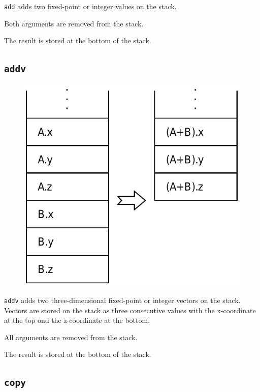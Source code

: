 			\texttt{add} adds two fixed-point or integer values on the stack.
			
			Both arguments are removed from the stack.
			
			The result is stored at the bottom of the stack.
	
	\qquad
	
	\subsection*{\texttt{addv}}
	
		\begin{figure}
			\begin{flushright}
				\includegraphics[width=\linewidth]{figure/pdf/i_addv} 
			\end{flushright}
		\end{figure}
	
			\texttt{addv} adds two three-dimensional fixed-point or integer
			vectors on the stack. Vectors are stored on the stack as three
			consecutive values with the x-coordinate at the top ond the
			z-coordinate at the bottom.
			
			All arguments are removed from the stack.
			
			The result is stored at the bottom of the stack.
	
	\qquad\qquad
	
	\subsection*{\texttt{copy}}
	
